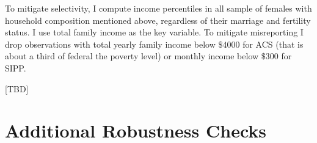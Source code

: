\documentclass[12pt,letter]{article}
\begin{document}
To mitigate selectivity, I compute income percentiles in all sample of females with household composition mentioned above, regardless of their marriage and fertility status. I use total family income as the key variable. To mitigate misreporting I drop observations with total yearly family income below $\$4000$ for ACS (that is about a third of federal the poverty level) or monthly income below $\$300$ for SIPP.

[TBD]

\section{Additional Robustness Checks}

\end{document}
